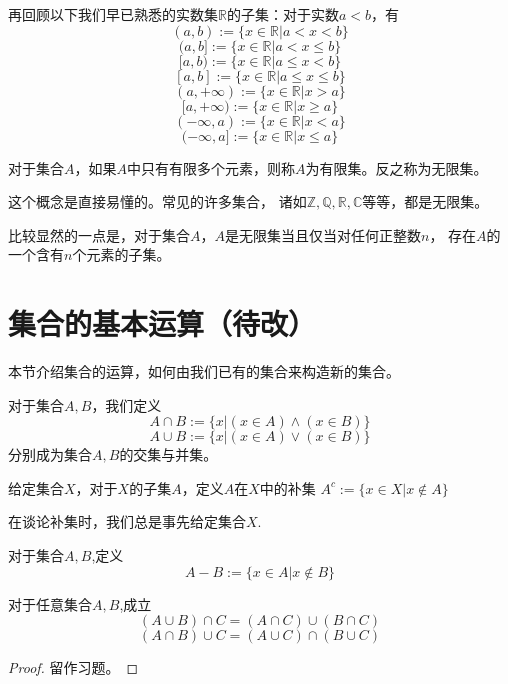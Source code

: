 \begin{example}[开区间与闭区间]
再回顾以下我们早已熟悉的实数集$\mathbb{R}$的子集：对于实数$a<b$，有
$$(a,b):=\{x\in\mathbb{R}|a<x<b\}$$
$$(a,b]:=\{x\in\mathbb{R}|a<x\leq b\}$$
$$[a,b):=\{x\in\mathbb{R}|a\leq x<b\}$$
$$[a,b]:=\{x\in\mathbb{R}|a\leq x\leq b\}$$
$$(a,+\infty):=\{x\in\mathbb{R}|x>a\}$$
$$[a,+\infty):=\{x\in\mathbb{R}|x\geq a\}$$
$$(-\infty,a):=\{x\in\mathbb{R}|x<a\}$$
$$(-\infty,a]:=\{x\in\mathbb{R}|x\leq a\}$$
\end{example}

\begin{definition}[有限集与无限集]
对于集合$A$，如果$A$中只有有限多个元素，则称$A$为有限集。反之称为无限集。
\end{definition}
这个概念是直接易懂的。常见的许多集合，
诸如$\mathbb{Z},\mathbb{Q},\mathbb{R},\mathbb{C}$等等，都是无限集。

比较显然的一点是，对于集合$A$，$A$是无限集当且仅当对任何正整数$n$，
存在$A$的一个含有$n$个元素的子集。

\fengexian
 

\section{集合的基本运算（待改）}

本节介绍集合的运算，如何由我们已有的集合来构造新的集合。
\begin{definition}[集合的交、并]
对于集合$A,B$，我们定义
$$A\cap B:=\{x|(x\in A)\wedge(x\in B)\}$$
$$A\cup B:=\{x|(x\in A)\vee(x\in B)\}$$
分别成为集合$A,B$的交集与并集。
\end{definition}

\begin{definition}[补集]
给定集合$X$，对于$X$的子集$A$，定义$A$在$X$中的补集
$A^c:=\{x\in X|x\not\in A\}$
\end{definition}
在谈论补集时，我们总是事先给定集合$X$.

\begin{definition}[差集]
对于集合$A,B$,定义
$$A-B:=\{x\in A|x\not\in B\}$$
\end{definition}

\begin{prop}[交、并的分配律]\label{set-fenpeilv}
对于任意集合$A,B$,成立
$$(A\cup B)\cap C=(A\cap C)\cup(B\cap C)$$
$$(A\cap B)\cup C=(A\cup C)\cap(B\cup C)$$
\end{prop}
\begin{proof}
留作习题。
\end{proof}

